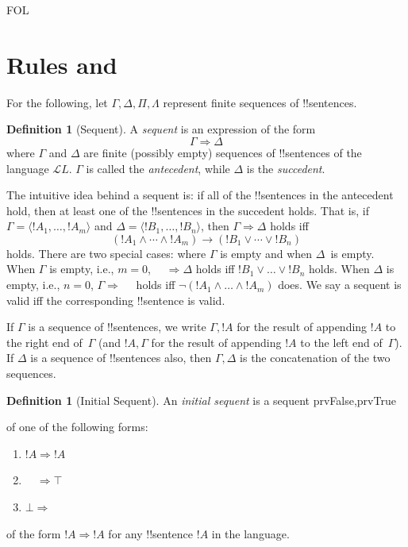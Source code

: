\documentclass[10pt,a4paper]{article}
\theoremstyle{plain}
\theoremstyle{definition}
\newtheorem{defn}[thm]{Definition}
\theoremstyle{remark}
\newenvironment{explain}{}{}
\newcommand*{\olfileid}[3]{}
\newcommand*{\olsection}[1]{\section*{#1}}
\providecommand{\lif}{\mathbin{\rightarrow}}
\providecommand{\ltrue}{\top}
\providecommand{\lfalse}{\bot}
\providecommand{\Sequent}{\mathrel{\Rightarrow}}
\providecommand{\Lang}{\ensuremath{\mathcal{L}}}
\providecommand{\tuple}[1]{\langle #1 \rangle}
\providecommand{\iftag}[1]{#1}
\providecommand{\tagitem}[1]{\item[#1]}
\begin{document}
\iftag{FOL}
      {\olfileid{fol}{seq}{rul}}
      {\olfileid{pl}{seq}{rul}}

\olsection{Rules and }

For the following, let $\Gamma, \Delta, \Pi, \Lambda$ represent finite
sequences of !!{sentence}s.

\begin{defn}[Sequent]
A \emph{sequent} is an expression of the form
\[
\Gamma \Sequent \Delta
\]
where $\Gamma$ and $\Delta$ are finite (possibly empty) sequences of
!!{sentence}s of the language $\Lang L$. $\Gamma$ is called the
\emph{antecedent}, while $\Delta$ is the \emph{succedent}.
\end{defn}

\begin{explain}
The intuitive idea behind a sequent is: if all of the !!{sentence}s in
the antecedent hold, then at least one of the !!{sentence}s in the
succedent holds. That is, if $\Gamma = \tuple{!A_1, \dots, !A_m}$ and
$\Delta = \tuple{!B_1, \dots, !B_n}$, then $\Gamma \Sequent \Delta$
holds iff
\[
(!A_1 \land \cdots \land !A_m) \lif (!B_1 \lor \cdots \lor
!B_n)
\]
holds. There are two special cases: where $\Gamma$ is empty and when
$\Delta$~is empty. When $\Gamma$ is empty, i.e., $m = 0$, $\quad
\Sequent \Delta$ holds iff $!B_1 \lor \dots \lor !B_n$ holds. When
$\Delta$ is empty, i.e., $n = 0$, $\Gamma \Sequent \quad$ holds iff
$\lnot(!A_1 \land \dots \land !A_m)$ does.  We say a sequent is valid
iff the corresponding !!{sentence} is valid.
\end{explain}

If $\Gamma$ is a sequence of !!{sentence}s, we write $\Gamma, !A$ for
the result of appending $!A$ to the right end of~$\Gamma$ (and $!A,
\Gamma$ for the result of appending $!A$ to the left end
of~$\Gamma$). If $\Delta$ is a sequence of !!{sentence}s also, then $\Gamma,
\Delta$ is the concatenation of the two sequences.

\begin{defn}[Initial Sequent]
An \emph{initial sequent} is a sequent
\iftag{prvFalse,prvTrue}{of one of the following forms:
  \begin{enumerate}
    \item $!A \Sequent !A$
    \tagitem{prvTrue}{$\quad \Sequent \ltrue$}{}
    \tagitem{prvFalse}{$\lfalse \Sequent \quad$}{}
  \end{enumerate}}
{of the form $!A \Sequent !A$} for any !!{sentence} $!A$ in the language.
\end{defn}
\end{document}

